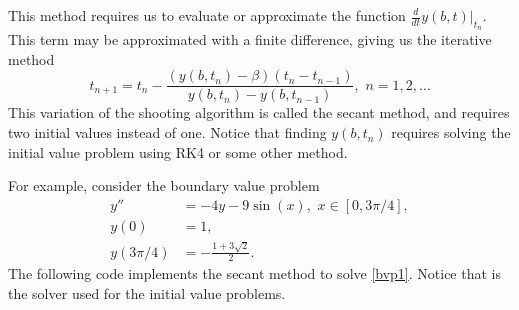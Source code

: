 This method requires us to evaluate or approximate the function $\frac{d}{dt} \left.y(b,t)\right|_{t_n}$.
This term may be approximated with a finite difference, giving us the iterative method
\[t_{n+1} = t_n - \frac{ (y(b,t_n) - \beta)(t_n - t_{n-1})}{y(b,t_n) - y(b,t_{n-1}) }, \,\, n = 1, 2,\hdots\]
This variation of the shooting algorithm is called the secant method, and requires two initial values instead of one.
Notice that finding $y(b,t_n)$ requires solving the initial value problem using RK4 or some other method.

For example, consider the boundary value problem
\begin{equation}
\begin{split}
\label{bvp1}
y'' &= -4y -9\sin(x), \,\, x \in [0,3\pi/4],\\
y(0) &= 1, \\
y(3 \pi/4) &= -\frac{1+3\sqrt{2}}{2}.
\end{split}
\end{equation}
The following code implements the secant method to solve \eqref{bvp1}.
Notice that  is the solver used for the initial value problems.




%
%

